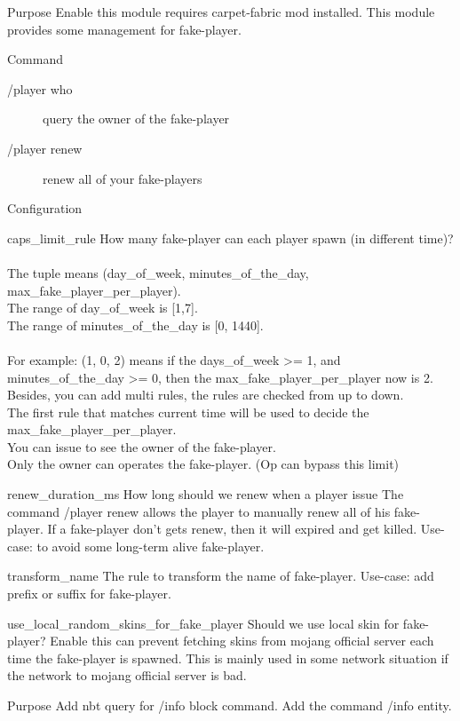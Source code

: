 


Purpose
Enable this module requires carpet-fabric mod installed.
This module provides some management for fake-player.

Command
\begin{description}
    \item [/player who] query the owner of the fake-player
    \item[/player renew] renew all of your fake-players
\end{description}

Configuration
\begin{Configuration}
    \item[caps\_limit\_rule] {
        How many fake-player can each player spawn (in different time)?\\
        \\
        The tuple means (day\_of\_week, minutes\_of\_the\_day, max\_fake\_player\_per\_player).\\
        The range of day\_of\_week is [1,7].\\
        The range of minutes\_of\_the\_day is [0, 1440].\\
        \\
        For example: (1, 0, 2) means if the days\_of\_week >= 1, and minutes\_of\_the\_day >= 0, then the max\_fake\_player\_per\_player now is 2.\\
        Besides, you can add multi rules, the rules are checked from up to down.\\
        The first rule that matches current time will be used to decide the max\_fake\_player\_per\_player.\\
        You can issue  to see the owner of the fake-player.\\
        Only the owner can operates the fake-player. (Op can bypass this limit)
    }

    \item[renew\_duration\_ms] {
        How long should we renew when a player issue 
        The command /player renew allows the player to manually renew all of his fake-player.
        If a fake-player don't gets renew, then it will expired and get killed.
        Use-case: to avoid some long-term alive fake-player.
    }

    \item[transform\_name]{
        The rule to transform the name of fake-player.
        Use-case: add prefix or suffix for fake-player.
    }
    \item[use\_local\_random\_skins\_for\_fake\_player]{
        Should we use local skin for fake-player?
        Enable this can prevent fetching skins from mojang official server each time the fake-player is spawned.
        This is mainly used in some network situation if the network to mojang official server is bad.
    }
\end{Configuration}

\clearpage

Purpose
Add nbt query for /info block command.
Add the command /info entity.




